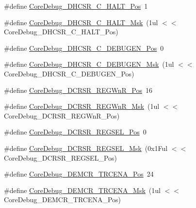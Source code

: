 \begin{DoxyCompactItemize}
\item 
\#define \hyperlink{group___c_m_s_i_s___c_m3___core_debug_gaddf1d43f8857e4efc3dc4e6b15509692}{Core\+Debug\+\_\+\+D\+H\+C\+S\+R\+\_\+\+C\+\_\+\+H\+A\+L\+T\+\_\+\+Pos}~1
\item 
\#define \hyperlink{group___c_m_s_i_s___c_m3___core_debug_ga1d905a3aa594eb2e8bb78bcc4da05b3f}{Core\+Debug\+\_\+\+D\+H\+C\+S\+R\+\_\+\+C\+\_\+\+H\+A\+L\+T\+\_\+\+Msk}~(1ul $<$$<$ Core\+Debug\+\_\+\+D\+H\+C\+S\+R\+\_\+\+C\+\_\+\+H\+A\+L\+T\+\_\+\+Pos)
\item 
\#define \hyperlink{group___c_m_s_i_s___c_m3___core_debug_gab557abb5b172b74d2cf44efb9d824e4e}{Core\+Debug\+\_\+\+D\+H\+C\+S\+R\+\_\+\+C\+\_\+\+D\+E\+B\+U\+G\+E\+N\+\_\+\+Pos}~0
\item 
\#define \hyperlink{group___c_m_s_i_s___c_m3___core_debug_gab815c741a4fc2a61988cd2fb7594210b}{Core\+Debug\+\_\+\+D\+H\+C\+S\+R\+\_\+\+C\+\_\+\+D\+E\+B\+U\+G\+E\+N\+\_\+\+Msk}~(1ul $<$$<$ Core\+Debug\+\_\+\+D\+H\+C\+S\+R\+\_\+\+C\+\_\+\+D\+E\+B\+U\+G\+E\+N\+\_\+\+Pos)
\item 
\#define \hyperlink{group___c_m_s_i_s___c_m3___core_debug_ga51e75942fc0614bc9bb2c0e96fcdda9a}{Core\+Debug\+\_\+\+D\+C\+R\+S\+R\+\_\+\+R\+E\+G\+Wn\+R\+\_\+\+Pos}~16
\item 
\#define \hyperlink{group___c_m_s_i_s___c_m3___core_debug_ga1eef4992d8f84bc6c0dffed1c87f90a5}{Core\+Debug\+\_\+\+D\+C\+R\+S\+R\+\_\+\+R\+E\+G\+Wn\+R\+\_\+\+Msk}~(1ul $<$$<$ Core\+Debug\+\_\+\+D\+C\+R\+S\+R\+\_\+\+R\+E\+G\+Wn\+R\+\_\+\+Pos)
\item 
\#define \hyperlink{group___c_m_s_i_s___c_m3___core_debug_ga52182c8a9f63a52470244c0bc2064f7b}{Core\+Debug\+\_\+\+D\+C\+R\+S\+R\+\_\+\+R\+E\+G\+S\+E\+L\+\_\+\+Pos}~0
\item 
\#define \hyperlink{group___c_m_s_i_s___c_m3___core_debug_ga17cafbd72b55030219ce5609baa7c01d}{Core\+Debug\+\_\+\+D\+C\+R\+S\+R\+\_\+\+R\+E\+G\+S\+E\+L\+\_\+\+Msk}~(0x1\+Ful $<$$<$ Core\+Debug\+\_\+\+D\+C\+R\+S\+R\+\_\+\+R\+E\+G\+S\+E\+L\+\_\+\+Pos)
\item 
\#define \hyperlink{group___c_m_s_i_s___c_m3___core_debug_ga6ff2102b98f86540224819a1b767ba39}{Core\+Debug\+\_\+\+D\+E\+M\+C\+R\+\_\+\+T\+R\+C\+E\+N\+A\+\_\+\+Pos}~24
\item 
\#define \hyperlink{group___c_m_s_i_s___c_m3___core_debug_ga5e99652c1df93b441257389f49407834}{Core\+Debug\+\_\+\+D\+E\+M\+C\+R\+\_\+\+T\+R\+C\+E\+N\+A\+\_\+\+Msk}~(1ul $<$$<$ Core\+Debug\+\_\+\+D\+E\+M\+C\+R\+\_\+\+T\+R\+C\+E\+N\+A\+\_\+\+Pos)
\item 
$$
\end{DoxyCompactItemize}
